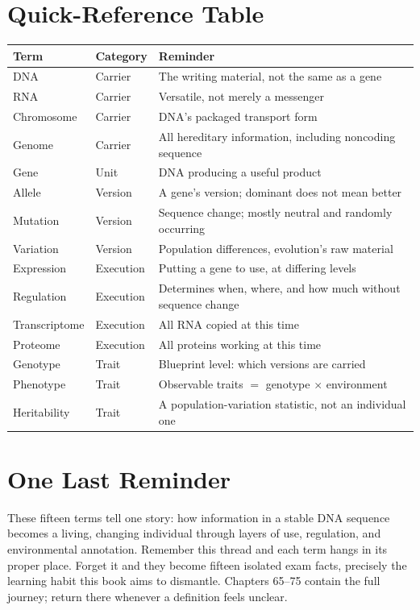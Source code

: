\section*{Quick-Reference Table}

\begin{table}[htbp]
\centering
\begin{tabular}{llp{6.2cm}}
\toprule
\textbf{Term} & \textbf{Category} & \textbf{Reminder} \\
\midrule
DNA & Carrier & The writing material, not the same as a gene \\
RNA & Carrier & Versatile, not merely a messenger \\
Chromosome & Carrier & DNA's packaged transport form \\
Genome & Carrier & All hereditary information, including noncoding sequence \\
Gene & Unit & DNA producing a useful product \\
Allele & Version & A gene's version; dominant does not mean better \\
Mutation & Version & Sequence change; mostly neutral and randomly occurring \\
Variation & Version & Population differences, evolution's raw material \\
Expression & Execution & Putting a gene to use, at differing levels \\
Regulation & Execution & Determines when, where, and how much without sequence change \\
Transcriptome & Execution & All RNA copied at this time \\
Proteome & Execution & All proteins working at this time \\
Genotype & Trait & Blueprint level: which versions are carried \\
Phenotype & Trait & Observable traits $=$ genotype $\times$ environment \\
Heritability & Trait & A population-variation statistic, not an individual one \\
\bottomrule
\end{tabular}
\end{table}

\section*{One Last Reminder}

These fifteen terms tell one story: how information in a stable DNA sequence becomes a living, changing individual through layers of use, regulation, and environmental annotation. Remember this thread and each term hangs in its proper place. Forget it and they become fifteen isolated exam facts, precisely the learning habit this book aims to dismantle. Chapters 65--75 contain the full journey; return there whenever a definition feels unclear.
